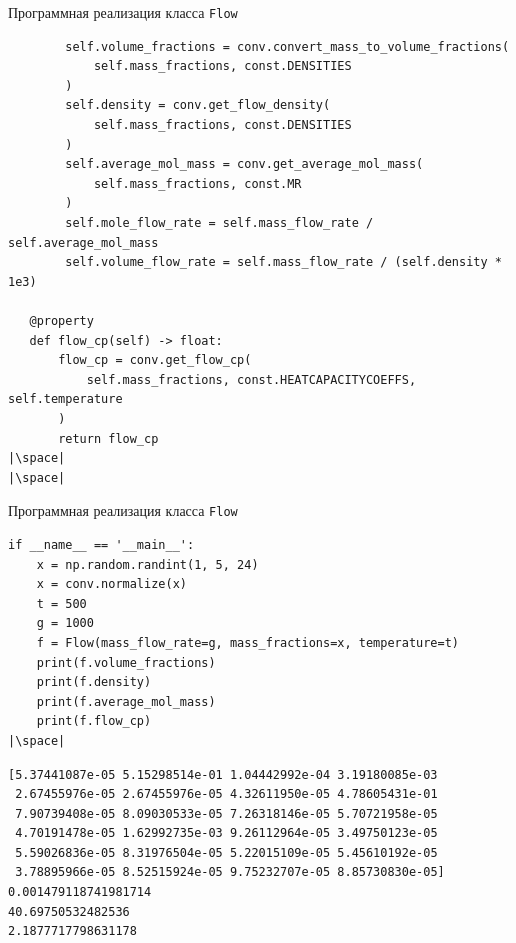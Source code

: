 \documentclass[aspectratio=169, mathserif]{beamer}	%
\begin{document}
\begin{frame}[fragile]{Программная реализация класса \texttt{Flow}}
\scriptsize
\begin{verbatim}
        self.volume_fractions = conv.convert_mass_to_volume_fractions(
            self.mass_fractions, const.DENSITIES
        )
        self.density = conv.get_flow_density(
            self.mass_fractions, const.DENSITIES
        )
        self.average_mol_mass = conv.get_average_mol_mass(
            self.mass_fractions, const.MR
        )
        self.mole_flow_rate = self.mass_flow_rate / self.average_mol_mass
        self.volume_flow_rate = self.mass_flow_rate / (self.density * 1e3)

   @property
   def flow_cp(self) -> float:
       flow_cp = conv.get_flow_cp(
           self.mass_fractions, const.HEATCAPACITYCOEFFS, self.temperature
       )
       return flow_cp
|\space|
|\space|
\end{verbatim}
\vfill
\end{frame}

\begin{frame}[fragile]{Программная реализация класса \texttt{Flow}}
\scriptsize
\begin{verbatim}
if __name__ == '__main__':
    x = np.random.randint(1, 5, 24)
    x = conv.normalize(x)
    t = 500
    g = 1000
    f = Flow(mass_flow_rate=g, mass_fractions=x, temperature=t)
    print(f.volume_fractions)
    print(f.density)
    print(f.average_mol_mass)
    print(f.flow_cp)
|\space|
\end{verbatim}
\begin{verbatim}
[5.37441087e-05 5.15298514e-01 1.04442992e-04 3.19180085e-03
 2.67455976e-05 2.67455976e-05 4.32611950e-05 4.78605431e-01
 7.90739408e-05 8.09030533e-05 7.26318146e-05 5.70721958e-05
 4.70191478e-05 1.62992735e-03 9.26112964e-05 3.49750123e-05
 5.59026836e-05 8.31976504e-05 5.22015109e-05 5.45610192e-05
 3.78895966e-05 8.52515924e-05 9.75232707e-05 8.85730830e-05]
0.001479118741981714
40.69750532482536
2.1877717798631178
    \end{verbatim}
\vfill
\end{frame}
\end{document}
